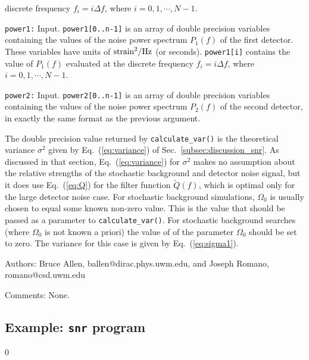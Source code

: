 \begin{description}
discrete frequency $f_i=i\Delta f$, where $i=0,1,\cdots,N-1$.
%
\item{\tt power1:} Input.  
{\tt power1[0..n-1]} is an array of double precision variables 
containing the values of the noise power spectrum $P_1(f)$ of the 
first detector.
These variables have units of ${\rm strain}^2/{\rm Hz}$ (or seconds).
{\tt power1[i]} contains the value of $P_1(f)$ evaluated at the discrete
frequency $f_i=i\Delta f$, where $i=0,1,\cdots,N-1$.
%
\item{\tt power2:} Input.  
{\tt power2[0..n-1]} is an array of double precision variables 
containing the values of the noise power spectrum $P_2(f)$ of the 
second detector, in exactly the same format as the previous
argument.
\end{description}

The double precision value returned by {\tt calculate\_var()} is
the theoretical variance $\sigma^2$ given by Eq.~(\ref{eq:variance})
of Sec.~\ref{subsec:discussion_snr}.
As discussed in that section, Eq.~(\ref{eq:variance}) for $\sigma^2$
makes no assumption about the relative strengths of the stochastic
background and detector noise signal, but it does use Eq.~(\ref{eq:Q}) 
for the filter function $\tilde Q(f)$, which is optimal only for the 
large detector noise case.
For stochastic background simulations, $\Omega_0$ is usually chosen to
equal some known non-zero value.
This is the value that should be passed as a parameter to 
{\tt calculate\_var()}.
For stochastic background searches (where $\Omega_0$ is not known
a priori) the value of of the parameter $\Omega_0$ should be set to zero.
The variance for this case is given by Eq.~(\ref{eq:sigma1}).
%
\begin{description}
\item{Authors:}
Bruce Allen, ballen@dirac.phys.uwm.edu, and Joseph Romano, romano@csd.uwm.edu
\item{Comments:} 
None.
\end{description}
\clearpage

\subsection{Example: {\tt snr} program}
\label{subsec:example_snr}
\setcounter{equation}0

